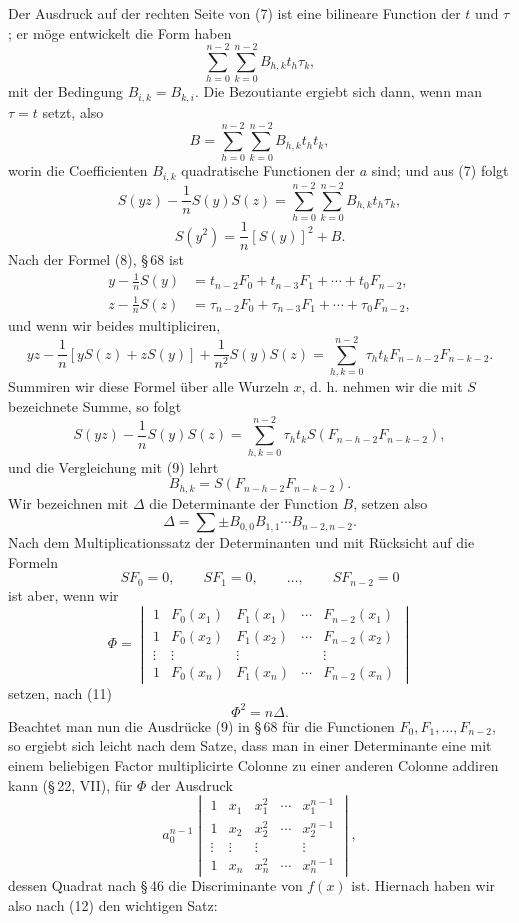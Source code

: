 \documentclass[11pt]{article}
\begin{document}
Der Ausdruck auf der rechten Seite von (7) ist eine bilineare Function der $t$ und $\tau$; er möge entwickelt die Form haben
\[
 \sum_{h=0}^{n-2}\sum_{k=0}^{n-2}B_{h,k}t_h\tau_k,
\]
mit der Bedingung $B_{i,k}=B_{k,i}$. Die Bezoutiante ergiebt sich dann, wenn man $\tau=t$ setzt, also
\begin{equation}
 B=\sum_{h=0}^{n-2}\sum_{k=0}^{n-2}B_{h,k}t_ht_k,
\tag{8}
\end{equation}
worin die Coefficienten $B_{i,k}$ quadratische Functionen der $a$ sind; und aus (7) folgt
\begin{equation}
 S(yz)-\frac1nS(y)S(z)=\sum_{h=0}^{n-2}\sum_{k=0}^{n-2}B_{h,k}t_h\tau_k,
\tag{9}
\end{equation}
\begin{equation}
 S(y^2)=\frac1n[S(y)]^2+B.
\tag{10}
\end{equation}
Nach der Formel (8), \S\,68 ist
\[
\begin{aligned}
 y-\frac1nS(y)&=t_{n-2}F_0+t_{n-3}F_1+\cdots+t_0F_{n-2},\\
 z-\frac1nS(z)&=\tau_{n-2}F_0+\tau_{n-3}F_1+\cdots+\tau_0F_{n-2},
\end{aligned}
\]
und wenn wir beides multipliciren,
\[
 yz-\frac1n[yS(z)+zS(y)]+\frac1{n^2}S(y)S(z)
 =\sum_{h,k=0}^{n-2}\tau_ht_kF_{n-h-2}F_{n-k-2}.
\]
Summiren wir diese Formel über alle Wurzeln $x$, d. h. nehmen wir die mit $S$ bezeichnete Summe, so folgt
\[
 S(yz)-\frac1nS(y)S(z)=\sum_{h,k=0}^{n-2}\tau_ht_kS(F_{n-h-2}F_{n-k-2}),
\]
und die Vergleichung mit (9) lehrt
\begin{equation}
 B_{h,k}=S(F_{n-h-2}F_{n-k-2}).
\tag{11}
\end{equation}
Wir bezeichnen mit $\Delta$ die Determinante der Function $B$, setzen also
\[
 \Delta=\sum \pm B_{0,0}B_{1,1}\cdots B_{n-2,n-2}.
\]
Nach dem Multiplicationssatz der Determinanten und mit Rücksicht auf die Formeln
\[
 SF_0=0,\qquad SF_1=0,\qquad\ldots,\qquad SF_{n-2}=0
\]
ist aber, wenn wir
\[
 \Phi=\begin{vmatrix}
 1&F_0(x_1)&F_1(x_1)&\cdots&F_{n-2}(x_1)\\
 1&F_0(x_2)&F_1(x_2)&\cdots&F_{n-2}(x_2)\\
 \vdots&\vdots&\vdots&&\vdots\\
 1&F_0(x_n)&F_1(x_n)&\cdots&F_{n-2}(x_n)
 \end{vmatrix}
\]
setzen, nach (11)
\begin{equation}
 \Phi^2=n\Delta.
\tag{12}
\end{equation}
Beachtet man nun die Ausdrücke (9) in \S\,68 für die Functionen $F_0,F_1,\ldots,F_{n-2}$, so ergiebt sich leicht nach dem Satze, dass man in einer Determinante eine mit einem beliebigen Factor multiplicirte Colonne zu einer anderen Colonne addiren kann (\S\,22, VII), für $\Phi$ der Ausdruck
\[
 a_0^{n-1}
 \begin{vmatrix}
 1&x_1&x_1^2&\cdots&x_1^{n-1}\\
 1&x_2&x_2^2&\cdots&x_2^{n-1}\\
 \vdots&\vdots&\vdots&&\vdots\\
 1&x_n&x_n^2&\cdots&x_n^{n-1}
 \end{vmatrix},
\]
dessen Quadrat nach \S\,46 die Discriminante von $f(x)$ ist. Hiernach haben wir also nach (12) den wichtigen Satz:
\end{document}
